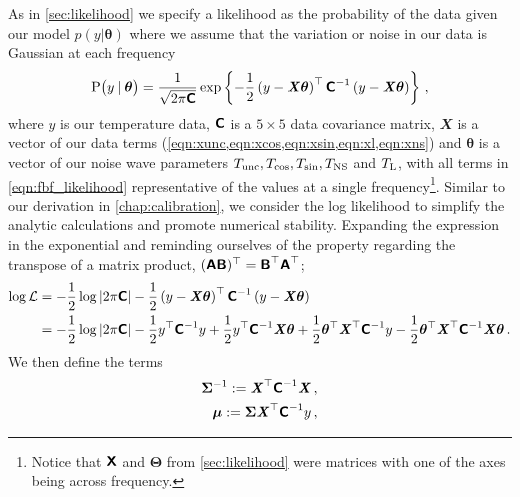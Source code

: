 As in \cref{sec:likelihood} we specify a likelihood as the probability of the data given our model $p( y \vert \boldsymbol{\theta} )$ where we assume that the variation or noise in our data is Gaussian at each frequency
\begin{equation}
    \label{eqn:fbf_likelihood}
    \mathrm{P}\big( y \:\vert\: \boldsymbol{\theta} \big) = \frac{1}{ \sqrt{ 2 \pi \textbf{\textsf{C}} } } \exp \left\{ - \frac{1}{2} \left( y - \textbf{\textit{X}}\boldsymbol{\theta} \right)^{\top} \textbf{\textsf{C}}^{-1}  \left( y - \textbf{\textit{X}}\boldsymbol{\theta} \right) \right\} \,,
\end{equation}
where $y$ is our temperature data, $\textbf{\textsf{C}}$ is a $5 \times 5$ data covariance matrix, $\mathbfit{X}$ is a vector of our data terms (\cref{eqn:xunc,eqn:xcos,eqn:xsin,eqn:xl,eqn:xns}) and $\boldsymbol{\theta}$ is a vector of our noise wave parameters $T_{\mathrm{unc}}, T_{\mathrm{cos}}, T_{\mathrm{sin}}, T_{\mathrm{NS}}$ and $T_{\mathrm{L}}$, with all terms in \cref{eqn:fbf_likelihood} representative of the values at a single frequency\footnote{Notice that $\textbf{\textsf{X}}$ and $\boldsymbol{\Theta}$ from \cref{sec:likelihood} were matrices with one of the axes being across frequency.}. Similar to our derivation in \cref{chap:calibration}, we consider the log likelihood to simplify the analytic calculations and promote numerical stability. Expanding the expression in the exponential and reminding ourselves of the property regarding the transpose of a matrix product, $(\textbf{\textsf{AB}})^{\top} = \textbf{\textsf{B}}^{\top}\textbf{\textsf{A}}^{\top}$;
\begin{align}
    \log\mathcal{L} &= - \frac{1}{2} \log |2 \pi \textbf{\textsf{C}}| - \frac{1}{2} \left( y - \textbf{\textit{X}}\boldsymbol{\theta} \right)^{\top} \textbf{\textsf{C}}^{-1} \left( y - \textbf{\textit{X}}\boldsymbol{\theta} \right)
    \label{eqn:fbf_loglike} \\
    &= -\frac{1}{2} \log |2 \pi \textbf{\textsf{C}}| - \frac{1}{2} y^{\top} \textbf{\textsf{C}}^{-1} y + \frac{1}{2} y^{\top} \textbf{\textsf{C}}^{-1} \textbf{\textit{X}}\boldsymbol{\theta} + \frac{1}{2} \boldsymbol{\theta}^{\top} \textbf{\textit{X}}^{\top} \textbf{\textsf{C}}^{-1} y - \frac{1}{2} \boldsymbol{\theta}^{\top} \textbf{\textit{X}}^{\top} \textbf{\textsf{C}}^{-1} \textbf{\textit{X}} \boldsymbol{\theta} \,.
    \label{eqn:fbf_expand_loglike}
\end{align}
We then define the terms
\begin{align}
    \bm{\Sigma}^{-1} := \textbf{\textit{X}}^{\top} \textbf{\textsf{C}}^{-1} \textbf{\textit{X}} \,,
    \label{eqn:fbf_covmat} \\
    \boldsymbol{\mu} := \bm{\Sigma} \textbf{\textit{X}}^{\top} \textbf{\textsf{C}}^{-1} y \,,
    \label{eqn:fbf_mu}
\end{align}
